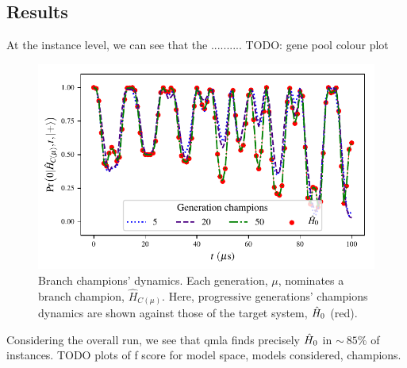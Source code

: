 \subsection{Results}
At the instance level, we can see that the ..........
TODO: gene pool colour plot
\begin{figure}
    \begin{center}
        \includegraphics{experimental_study/figures/nv_ga_branch_champion_dynamics.pdf}
    \end{center}
    \caption[Branch champion dynamics]{
        Branch champions' dynamics. 
        Each generation, $\mu$, nominates a branch champion, $\hat{H}_{C(\mu)}$. 
        Here, progressive generations' champions dynamics are shown against those of the target system, $\hat{H}_0$ (red). 
    }
    \label{fig:nv_ga_branch_champions}
\end{figure}



Considering the overall \gls{run}, we see that \gls{qmla} finds precisely $\hat{H}_0$ in $\sim~85\%$ of instances. 
TODO plots of f score for model space, models considered, champions. 

